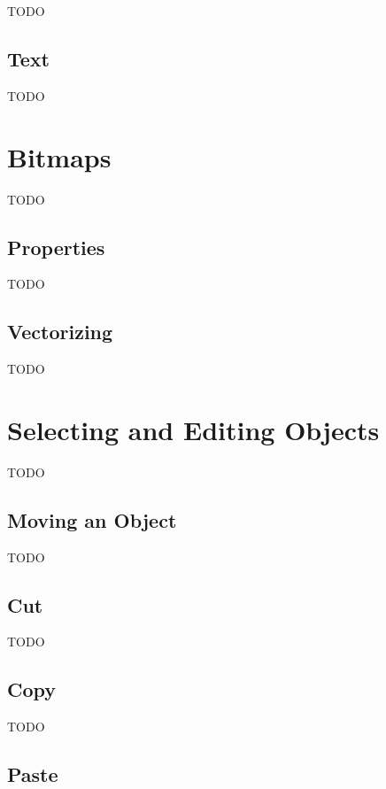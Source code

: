 TODO


\section{Text}\label{sec:newtext}

TODO


\chapter{Bitmaps}\label{sec:insertbitmap}

TODO


\section{Properties}\label{sec:bitmapprops}

TODO


\section{Vectorizing}\label{sec:vectorize}

TODO


\chapter{Selecting and Editing Objects}\label{sec:selectobjects}

TODO


\section{Moving an Object}\label{sec:moveobjects}

TODO


\section{Cut}\label{sec:cutobjects}

TODO


\section{Copy}\label{sec:copyobjects}

TODO


\section{Paste}\label{sec:pasteobjects}

